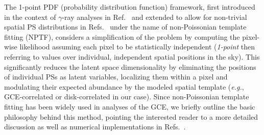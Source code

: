 \documentclass[prd,aps,10pt,nofootinbib,twocolumn,superscriptaddress,preprintnumbers,balancelastpage,longbibliography]{revtex4-1}
\begin{document}
The 1-point PDF (probability distribution function) framework, first introduced in the context of $\gamma$-ray analyses in Ref.~\cite{Malyshev:2011zi} and extended to allow for non-trivial spatial PS distributions in Refs.~\cite{Lee:2014mza,Lee:2015fea} under the name of non-Poissonian template fitting (NPTF), considers a simplification of the problem by computing the pixel-wise likelihood assuming each pixel to be statistically independent (\emph{1-point} then referring to values over individual, independent spatial positions in the sky). This significantly reduces the latent space dimensionality by eliminating the positions of individual PSs as latent variables, localizing them within a pixel and modulating their expected abundance by the modeled spatial template (\emph{e.g.}, GCE-correlated or disk-correlated in our case). Since non-Poissonian template fitting has been widely used in analyses of the GCE, we briefly outline the basic philosophy behind this method, pointing the interested reader to a more detailed discussion as well as numerical implementations in Refs.~\cite{Lee:2015fea,Mishra-Sharma:2016gis}.
\end{document}
